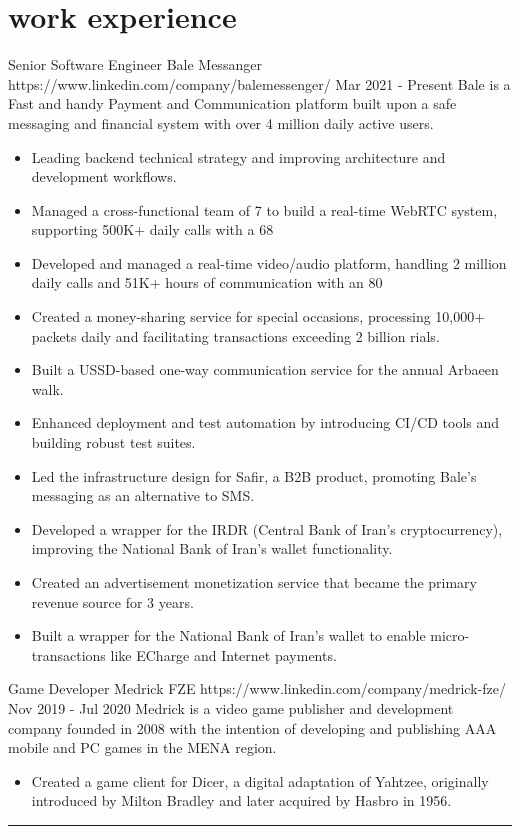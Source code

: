 \documentclass[a4paper,20pt]{article}
\begin{document}
\begin{minipage}[t]{0.65\textwidth}
  \section{work experience}
  {
    \expheadingwithlink
      {Senior Software Engineer}
      {Bale Messanger}
      {https://www.linkedin.com/company/balemessenger/}
      {Mar 2021 - Present}
      {Bale is a Fast and handy Payment and Communication platform built upon a safe messaging and financial system with over 4 million daily active users.}
    \begin{itemize}[leftmargin=.5cm, itemsep=1pt]
      \item \justifying\small Leading backend technical strategy and improving architecture and development workflows.
      \item \justifying\small Managed a cross-functional team of 7 to build a real-time WebRTC system, supporting 500K+ daily calls with a 68%
      \item \justifying\small Developed and managed a real-time video/audio platform, handling 2 million daily calls and 51K+ hours of communication with an 80%
      \item \justifying\small Created a money-sharing service for special occasions, processing 10,000+ packets daily and facilitating transactions exceeding 2 billion rials.
      \item \justifying\small Built a USSD-based one-way communication service for the annual Arbaeen walk.
      \item \justifying\small Enhanced deployment and test automation by introducing CI/CD tools and building robust test suites.
      \item \justifying\small Led the infrastructure design for Saﬁr, a B2B product, promoting Bale's messaging as an alternative to SMS.
      \item \justifying\small Developed a wrapper for the IRDR (Central Bank of Iran's cryptocurrency), improving the National Bank of Iran’s wallet functionality.
      \item \justifying\small Created an advertisement monetization service that became the primary revenue source for 3 years.
      \item \justifying\small Built a wrapper for the National Bank of Iran’s wallet to enable micro-transactions like ECharge and Internet payments.
  \end{itemize}

  \expheadingwithlink
    {Game Developer}
    {Medrick FZE}
    {https://www.linkedin.com/company/medrick-fze/}
    {Nov 2019 - Jul 2020}
    {Medrick is a video game publisher and development company founded in 2008 with the intention of developing and publishing AAA mobile and PC games in the MENA region.}

    \begin{itemize}[leftmargin=.5cm]
      \item \justifying\small Created a game client for Dicer, a digital adaptation of Yahtzee, originally introduced by Milton Bradley and later acquired by Hasbro in 1956.
    \end{itemize}
  }
\end{minipage}

\vspace{-1pt}
\rule{\textwidth}{1pt}
\end{document}
